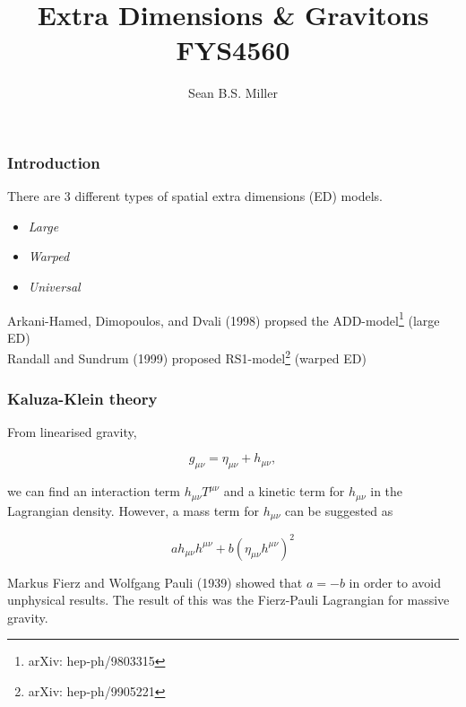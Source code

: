 \documentclass[10pt]{beamer}
\begin{document}
	\title{Extra Dimensions \& Gravitons \\ FYS4560}
	\author{\selectfont Sean B.S. Miller}
	\maketitle
	
	
	\begin{frame}
		\frametitle{Introduction}
		There are 3 different types of spatial extra dimensions (ED) models.
		\begin{itemize}
			\item \emph{Large}
			\item \emph{Warped}
			\item \emph{Universal}
		\end{itemize}
		
		Arkani-Hamed, Dimopoulos, and Dvali (1998) propsed the ADD-model\footnote{arXiv: hep-ph/9803315} (large ED)\\
		Randall and Sundrum (1999) proposed RS1-model\footnote{arXiv: hep-ph/9905221} (warped ED)\\
	\end{frame}
	
	\begin{frame}
		\frametitle{Kaluza-Klein theory}
		From linearised gravity,
		
		\begin{equation}
			g_{\mu\nu} = \eta_{\mu\nu} + h_{\mu\nu},
		\end{equation}
		
		we can find an interaction term $h_{\mu\nu}T^{\mu\nu}$ and a kinetic term for $h_{\mu\nu}$ in the Lagrangian density. However, a mass term for $h_{\mu\nu}$ can be suggested as
		
		\begin{equation}
			ah_{\mu\nu}h^{\mu\nu} + b(\eta_{\mu\nu}h^{\mu\nu})^2
		\end{equation}
		
		Markus Fierz and Wolfgang Pauli (1939) showed\cite{FP} that $a=-b$ in order to avoid unphysical results. The result of this was the Fierz-Pauli Lagrangian for massive gravity.
		
	\end{frame}
	
\end{document}
